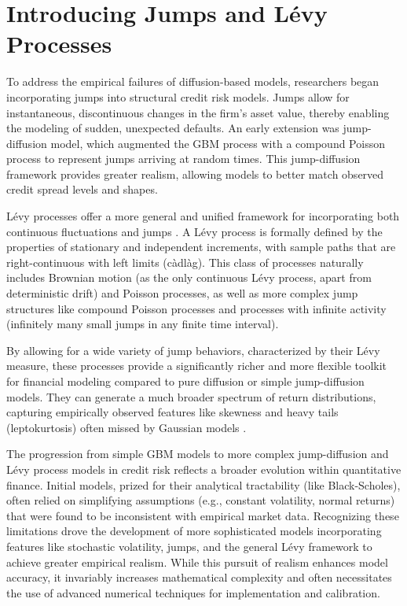 \documentclass[11pt,twoside,openright]{report}
\begin{document}
\section{Introducing Jumps and Lévy Processes}
\label{sec:intro_jumps_levy}

To address the empirical failures of diffusion-based models, researchers began incorporating jumps into structural credit risk models. Jumps allow for instantaneous, discontinuous changes in the firm's asset value, thereby enabling the modeling of sudden, unexpected defaults. An early extension was \cite{merton1976option} jump-diffusion model, which augmented the GBM process with a compound Poisson process to represent jumps arriving at random times. This jump-diffusion framework provides greater realism, allowing models to better match observed credit spread levels and shapes.

Lévy processes offer a more general and unified framework for incorporating both continuous fluctuations and jumps \cite{applebaum2009levy, kyprianou2006introductory}. A Lévy process is formally defined by the properties of stationary and independent increments, with sample paths that are right-continuous with left limits (càdlàg). This class of processes naturally includes Brownian motion (as the only continuous Lévy process, apart from deterministic drift) and Poisson processes, as well as more complex jump structures like compound Poisson processes and processes with infinite activity (infinitely many small jumps in any finite time interval).

By allowing for a wide variety of jump behaviors, characterized by their Lévy measure, these processes provide a significantly richer and more flexible toolkit for financial modeling compared to pure diffusion or simple jump-diffusion models. They can generate a much broader spectrum of return distributions, capturing empirically observed features like skewness and heavy tails (leptokurtosis) often missed by Gaussian models \cite{barndorff2001modelling}.

The progression from simple GBM models to more complex jump-diffusion and Lévy process models in credit risk reflects a broader evolution within quantitative finance. Initial models, prized for their analytical tractability (like Black-Scholes), often relied on simplifying assumptions (e.g., constant volatility, normal returns) that were found to be inconsistent with empirical market data. Recognizing these limitations drove the development of more sophisticated models incorporating features like stochastic volatility, jumps, and the general Lévy framework to achieve greater empirical realism. While this pursuit of realism enhances model accuracy, it invariably increases mathematical complexity and often necessitates the use of advanced numerical techniques for implementation and calibration.
\end{document}
